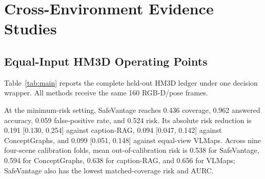 \documentclass{article}
\newcommand{\method}{SafeVantage}
\begin{document}


\section{Cross-Environment Evidence Studies}
\subsection{Equal-Input HM3D Operating Points}
Table~\ref{tab:main} reports the complete held-out HM3D ledger under one decision wrapper. All methods receive the same 160 RGB-D/pose frames.

\begin{table}[H]
  \centering
  \caption{\textbf{Equal-input HM3D operating points.} $R_9$ repeats calibration across nine folds; $R_{@\mathrm{cov}}$ matches coverage. Lower risk and AURC are better.}
  \label{tab:main}
  \resizebox{\linewidth}{!}{}
\end{table}

At the minimum-risk setting, \method{} reaches 0.436 coverage, 0.962 answered accuracy, 0.059 false-positive rate, and 0.524 risk. Its absolute risk reduction is 0.191 [0.130, 0.254] against caption-RAG, 0.094 [0.047, 0.142] against ConceptGraphs, and 0.099 [0.051, 0.148] against equal-view VLMaps. Across nine four-scene calibration folds, mean out-of-calibration risk is 0.538 for \method{}, 0.594 for ConceptGraphs, 0.638 for caption-RAG, and 0.656 for VLMaps; \method{} also has the lowest matched-coverage risk and AURC.
\end{document}
